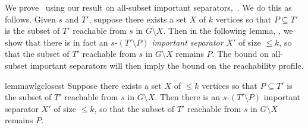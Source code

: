 \documentclass[11pt]{article}
\begin{document}
We prove~ using our result on all-subset important separators,~. We do this as follows. Given $s$ and $T'$, suppose there exists a set $X$ of $k$ vertices so that $P \subseteq T'$ is the subset of $T'$ reachable from $s$ in $G \setminus X$. Then in the following lemma, , we show that there is in fact an $s$-$(T' \setminus P)$ \emph{important separator} $X'$ of size $\leq k$, so that the subset of $T'$ reachable from $s$ in $G \setminus X$ remains $P$. The bound on all-subset important separators will then imply the bound on the reachability profile.  

\begin{restatable}{lemma}{wlgclosest}\label{lemma:wlgclosest}
Suppose there exists a set $X$ of $\leq k$ vertices so that $P \subseteq T'$ is the subset of $T'$ reachable from $s$ in $G \setminus X$. Then there is an $s$-$(T' \setminus P)$ important separator $X'$ of size $\leq k$, so that the subset of $T'$ reachable from $s$ in $G \setminus X$ remains $P$.
\end{restatable}
\end{document}
